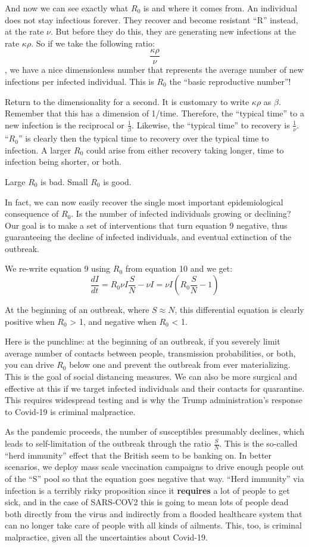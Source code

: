 \documentclass[]{article}
\begin{document}
And now we can see exactly what \(R_0\) is and where it comes from. An
individual does not stay infectious forever. They recover and become
resistant ``R'' instead, at the rate \(\nu\). But before they do this,
they are generating new infections at the rate \(\kappa \rho\). So if we
take the following ratio: \[\tag{10} \frac {\kappa \rho}{\nu}\], we have
a nice dimensionless number that represents the average number of new
infections per infected individual. This is \(R_0\) the ``basic
reproductive number''!

Return to the dimensionality for a second. It is customary to write
\(\kappa \rho\) as \(\beta\). Remember that this has a dimension of
1/time. Therefore, the ``typical time'' to a new infection is the
reciprocal or \(\frac{1}{\beta}\). Likewise, the ``typical time'' to
recovery is \(\frac{1}{\nu}\). ``\(R_0\)'' is clearly then the typical
time to recovery over the typical time to infection. A larger \(R_0\)
could arise from either recovery taking longer, time to infection being
shorter, or both.

Large \(R_0\) is bad. Small \(R_0\) is good.

In fact, we can now easily recover the single most important
epidemiological consequence of \(R_0\). Is the number of infected
individuals growing or declining? Our goal is to make a set of
interventions that turn equation 9 negative, thus guaranteeing the
decline of infected individuals, and eventual extinction of the
outbreak.

We re-write equation 9 using \(R_0\) from equation 10 and we get:
\[\tag {11} \frac {dI}{dt} = R_0 \nu I \frac{S}{N} - \nu I =  \nu I (R_0 \frac{S}{N} - 1) \]

At the beginning of an outbreak, where \(S \approx N\), this
differential equation is clearly positive when \(R_0\) \textgreater{} 1,
and negative when \(R_0\) \textless{} 1.

Here is the punchline: at the beginning of an outbreak, if you severely
limit average number of contacts between people, transmission
probabilities, or both, you can drive \(R_0\) below one and prevent the
outbreak from ever materializing. This is the goal of social distancing
measures. We can also be more surgical and effective at this if we
target infected individuals and their contacts for quarantine. This
requires widespread testing and is why the Trump administration's
response to Covid-19 is criminal malpractice.

As the pandemic proceeds, the number of susceptibles presumably
declines, which leads to self-limitation of the outbreak through the
ratio \(\frac{S}{N}\). This is the so-called ``herd immunity'' effect
that the British seem to be banking on. In better scenarios, we deploy
mass scale vaccination campaigns to drive enough people out of the ``S''
pool so that the equation goes negative that way. ``Herd immunity'' via
infection is a terribly risky proposition since it \textbf{requires} a
lot of people to get sick, and in the case of SARS-COV2 this is going to
mean lots of people dead both directly from the virus and indirectly
from a flooded healthcare system that can no longer take care of people
with all kinds of ailments. This, too, is criminal malpractice, given
all the uncertainties about Covid-19.
\end{document}

